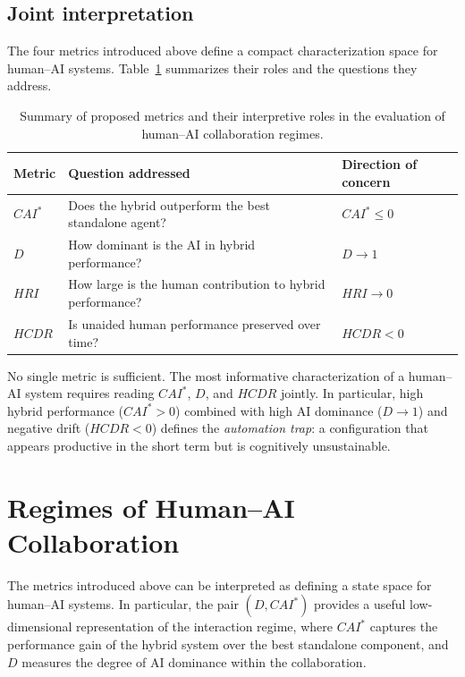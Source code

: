 \documentclass[11pt]{article}
\begin{document}
\subsection{Joint interpretation}

The four metrics introduced above define a compact characterization
space for human--AI systems. Table~\ref{tab:metric_summary} summarizes
their roles and the questions they address.

\begin{table}[ht]
\centering
\begin{tabular}{lll}
\toprule
Metric & Question addressed & Direction of concern \\
\midrule
$CAI^*$ & Does the hybrid outperform the best standalone agent?
        & $CAI^* \leq 0$ \\
$D$     & How dominant is the AI in hybrid performance?
        & $D \to 1$ \\
$HRI$   & How large is the human contribution to hybrid performance?
        & $HRI \to 0$ \\
$HCDR$  & Is unaided human performance preserved over time?
        & $HCDR < 0$ \\
\bottomrule
\end{tabular}
\caption{Summary of proposed metrics and their interpretive roles
in the evaluation of human--AI collaboration regimes.}
\label{tab:metric_summary}
\end{table}

No single metric is sufficient. The most informative characterization
of a human--AI system requires reading $CAI^*$, $D$, and $HCDR$
jointly. In particular, high hybrid performance ($CAI^* > 0$) combined
with high AI dominance ($D \to 1$) and negative drift ($HCDR < 0$)
defines the \emph{automation trap}: a configuration that appears
productive in the short term but is cognitively unsustainable.


\section{Regimes of Human--AI Collaboration}

The metrics introduced above can be interpreted as defining a state space
for human--AI systems. In particular, the pair $(D, CAI^*)$ provides a
useful low-dimensional representation of the interaction regime, where
$CAI^*$ captures the performance gain of the hybrid system over the best
standalone component, and $D$ measures the degree of AI dominance within
the collaboration.
\end{document}
